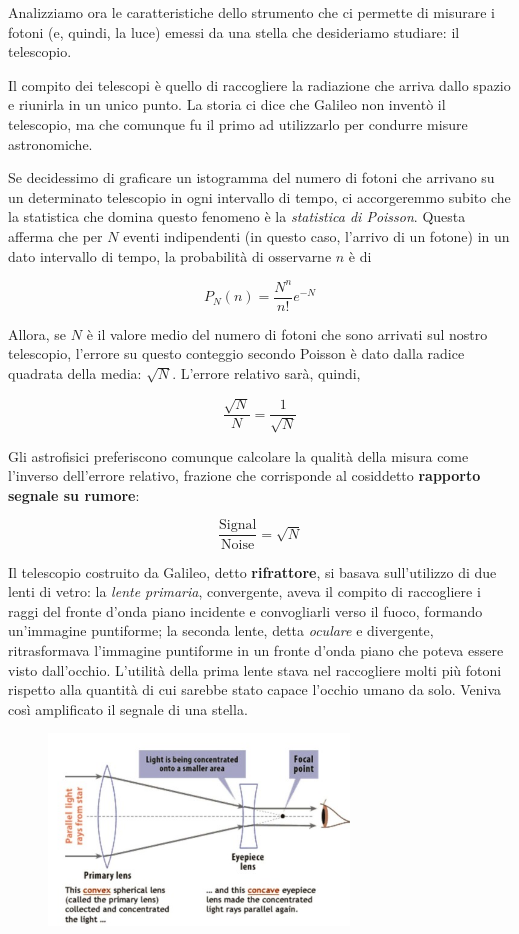 Analizziamo ora le caratteristiche dello strumento che ci permette di misurare i fotoni (e, quindi, la luce) emessi da una stella che desideriamo studiare: il telescopio.

Il compito dei telescopi è quello di raccogliere la radiazione che arriva dallo spazio e riunirla in un unico punto. La storia ci dice che Galileo non inventò il telescopio, ma che comunque fu il primo ad utilizzarlo per condurre misure astronomiche.

Se decidessimo di graficare un istogramma del numero di fotoni che arrivano su un determinato telescopio in ogni intervallo di tempo, ci accorgeremmo subito che la statistica che domina questo fenomeno è la \textit{statistica di Poisson}. Questa afferma che per $N$ eventi indipendenti (in questo caso, l'arrivo di un fotone) in un dato intervallo di tempo, la probabilità di osservarne $n$ è di

\begin{equation*}
    P_N(n) = \frac{N^n}{n!}e^{-N}
\end{equation*}

Allora, se $N$ è il valore medio del numero di fotoni che sono arrivati sul nostro telescopio, l'errore su questo conteggio secondo Poisson è dato dalla radice quadrata della media: $\sqrt{N}$. L'errore relativo sarà, quindi,

$$\frac{\sqrt{N}}{N} = \frac{1}{\sqrt{N}}$$

Gli astrofisici preferiscono comunque calcolare la qualità della misura come l'inverso dell'errore relativo, frazione che corrisponde al cosiddetto \textbf{rapporto segnale su rumore}:

\begin{equation}
    \frac{\text{Signal}}{\text{Noise}} = \sqrt{N}
\end{equation}

Il telescopio costruito da Galileo, detto \textbf{rifrattore}, si basava sull'utilizzo di due lenti di vetro: la \textit{lente primaria}, convergente, aveva il compito di raccogliere i raggi del fronte d'onda piano incidente e convogliarli verso il fuoco, formando un'immagine puntiforme; la seconda lente, detta \textit{oculare} e divergente, ritrasformava l'immagine puntiforme in un fronte d'onda piano che poteva essere visto dall'occhio. L'utilità della prima lente stava nel raccogliere molti più fotoni rispetto alla quantità di cui sarebbe stato capace l'occhio umano da solo. Veniva così amplificato il segnale di una stella.

\begin{figure}[H]
    \centering
    \includegraphics[width=8cm]{WhatsApp Image 2023-01-09 at 02.42.01.jpeg}
    \label{fig:my_label4}
\end{figure}

